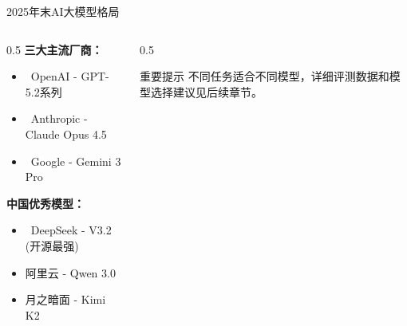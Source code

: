 \documentclass[aspectratio=169,11pt]{beamer}
\begin{document}
\begin{frame}{2025年末AI大模型格局}
    \begin{columns}
        \begin{column}{0.5\textwidth}
            \textbf{三大主流厂商：}
            \begin{itemize}
                \item \textcolor{openaigreen}{\faRobot\ OpenAI} - GPT-5.2系列
                \item \textcolor{anthropicred}{\faComment\ Anthropic} - Claude Opus 4.5
                \item \textcolor{googleblue}{\faGoogle\ Google} - Gemini 3 Pro
            \end{itemize}
            \vspace{0.5cm}
            \textbf{中国优秀模型：}
            \begin{itemize}
                \item \textcolor{deepseekblue}{\faBrain\ DeepSeek} - V3.2 (开源最强)
                \item 阿里云 - Qwen 3.0
                \item 月之暗面 - Kimi K2
            \end{itemize}
        \end{column}
        \begin{column}{0.5\textwidth}
            \begin{alertblock}{重要提示}
                不同任务适合不同模型，详细评测数据和模型选择建议见后续章节。
            \end{alertblock}
        \end{column}
    \end{columns}
\end{frame}

\end{document}
